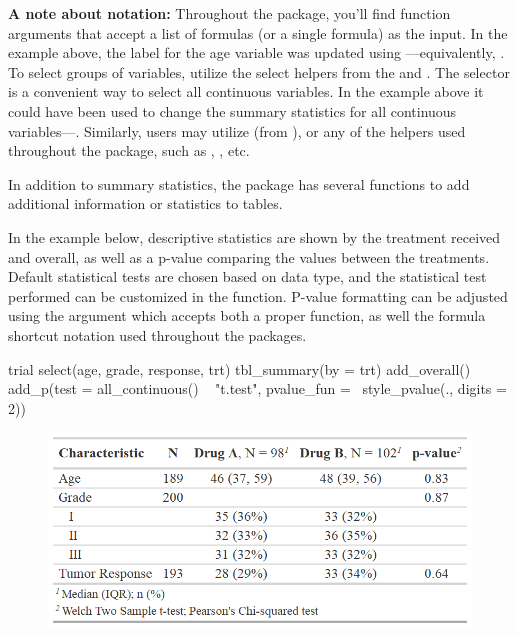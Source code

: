 \textbf{A note about notation:}
Throughout the  package, you'll find function arguments that accept a list of formulas (or a single formula) as the input.
In the example above, the label for the age variable was updated using ---equivalently, .
To select groups of variables, utilize the select helpers from the  and .
The  selector is a convenient way to select all continuous variables.
In the example above it could have been used to change the summary statistics for all continuous variables---. 
Similarly, users may utilize  (from ), or any of the  helpers used throughout the  package, such as , , etc.

In addition to summary statistics, the  package has several functions to add additional information or statistics to  tables.



In the example below, descriptive statistics are shown by the treatment received and overall, as well as a p-value comparing the values between the treatments.
Default statistical tests are chosen based on data type, and the statistical test performed can be customized in the  function.
P-value formatting can be adjusted using the  argument which accepts both a proper function, as well the formula shortcut notation used throughout the  packages.

\newpage
\begin{example}
trial %
  select(age, grade, response, trt) %
  tbl_summary(by = trt) %
  add_overall() %
  add_p(test = all_continuous() ~ "t.test",
        pvalue_fun = ~style_pvalue(., digits = 2))

\end{example}
\begin{figure}[h!]
  \includegraphics[scale=0.49]{summary_plus_plus.png}
  \centering
\end{figure}


